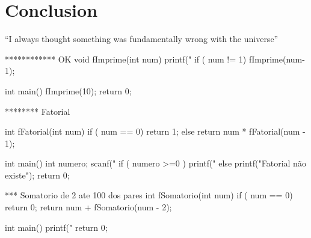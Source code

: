 \documentclass{article}
\begin{document}
\section{Conclusion}
``I always thought something was fundamentally wrong with the universe'' \citep{adams1995hitchhiker}

************ OK 
void fImprime(int num) {
    printf("%
    if ( num != 1) 
      fImprime(num-1);
}

int main()
{   fImprime(10);
    return 0;
}

******** Fatorial

int fFatorial(int num) {
    if ( num == 0) return 1;
    else return num * fFatorial(num - 1);
}

int main()
{   int numero;
    scanf("%
    if ( numero >=0 )
	  printf("%
	else
	  printf("Fatorial não existe");
    return 0;
}

*** Somatorio de 2 ate 100 dos pares
int fSomatorio(int num) {
    if ( num == 0) return 0;
	 return num + fSomatorio(num - 2);
}

int main()
{  	printf("%
    return 0;
}




\end{document}
